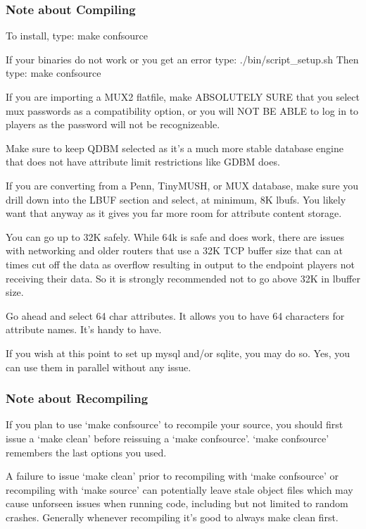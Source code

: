 \documentclass[letterpaper,10pt,english]{sphinxmanual}
\begin{document}
\subsubsection{Note about Compiling}
\label{\detokenize{installation:note-about-compiling}}
\sphinxAtStartPar
To install, type:  make confsource

\sphinxAtStartPar
If your binaries do not work or you get an error type:  ./bin/script\_setup.sh
Then type: make confsource

\sphinxAtStartPar
If you are importing a MUX2 flatfile, make ABSOLUTELY SURE that you select
mux passwords as a compatibility option, or you will NOT BE ABLE to log in
to players as the password will not be recognizeable.

\sphinxAtStartPar
Make sure to keep QDBM selected as it’s a much more stable database engine
that does not have attribute limit restrictions like GDBM does.

\sphinxAtStartPar
If you are converting from a Penn, TinyMUSH, or MUX database, make sure you
drill down into the LBUF section and select, at minimum, 8K lbufs.  You likely
want that anyway as it gives you far more room for attribute content storage.

\sphinxAtStartPar
You can go up to 32K safely.  While 64k is safe and does work, there are issues
with networking and older routers that use a 32K TCP buffer size that can
at times cut off the data as overflow resulting in output to the end\sphinxhyphen{}point
players not receiving their data.  So it is strongly recommended not to go
above 32K in lbuffer size.

\sphinxAtStartPar
Go ahead and select 64 char attributes.  It allows you to have 64 characters
for attribute names.  It’s handy to have.

\sphinxAtStartPar
If you wish at this point to set up mysql and/or sqlite, you  may do so.
Yes, you can use them in parallel without any issue.


\subsubsection{Note about Recompiling}
\label{\detokenize{installation:note-about-recompiling}}
\sphinxAtStartPar
If you plan to use ‘make confsource’ to recompile your source, you should first
issue a ‘make clean’ before re\sphinxhyphen{}issuing a ‘make confsource’.  ‘make confsource’
remembers the last options you used.

\sphinxAtStartPar
A failure to issue ‘make clean’ prior to re\sphinxhyphen{}compiling with ‘make confsource’ or
re\sphinxhyphen{}compiling with ‘make source’ can potentially leave stale object files which
may cause unforseen issues when running code, including but not limited to
random crashes.  Generally whenever recompiling it’s good to always make clean
first.
\end{document}
